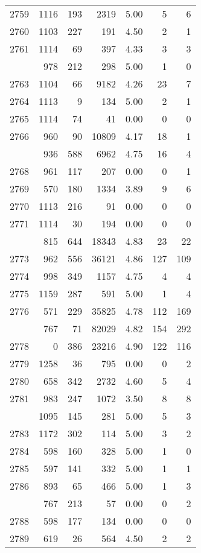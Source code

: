\documentclass[
]{article}
\begin{document}
\begin{table}
\begin{tabular}[t]{lrrrrrr}
2759 & 1116 & 193 & 2319 & 5.00 & 5 & 6\\
2760 & 1103 & 227 & 191 & 4.50 & 2 & 1\\
2761 & 1114 & 69 & 397 & 4.33 & 3 & 3\\
\addlinespace
2762 & 978 & 212 & 298 & 5.00 & 1 & 0\\
2763 & 1104 & 66 & 9182 & 4.26 & 23 & 7\\
2764 & 1113 & 9 & 134 & 5.00 & 2 & 1\\
2765 & 1114 & 74 & 41 & 0.00 & 0 & 0\\
2766 & 960 & 90 & 10809 & 4.17 & 18 & 1\\
\addlinespace
2767 & 936 & 588 & 6962 & 4.75 & 16 & 4\\
2768 & 961 & 117 & 207 & 0.00 & 0 & 1\\
2769 & 570 & 180 & 1334 & 3.89 & 9 & 6\\
2770 & 1113 & 216 & 91 & 0.00 & 0 & 0\\
2771 & 1114 & 30 & 194 & 0.00 & 0 & 0\\
\addlinespace
2772 & 815 & 644 & 18343 & 4.83 & 23 & 22\\
2773 & 962 & 556 & 36121 & 4.86 & 127 & 109\\
2774 & 998 & 349 & 1157 & 4.75 & 4 & 4\\
2775 & 1159 & 287 & 591 & 5.00 & 1 & 4\\
2776 & 571 & 229 & 35825 & 4.78 & 112 & 169\\
\addlinespace
2777 & 767 & 71 & 82029 & 4.82 & 154 & 292\\
2778 & 0 & 386 & 23216 & 4.90 & 122 & 116\\
2779 & 1258 & 36 & 795 & 0.00 & 0 & 2\\
2780 & 658 & 342 & 2732 & 4.60 & 5 & 4\\
2781 & 983 & 247 & 1072 & 3.50 & 8 & 8\\
\addlinespace
2782 & 1095 & 145 & 281 & 5.00 & 5 & 3\\
2783 & 1172 & 302 & 114 & 5.00 & 3 & 2\\
2784 & 598 & 160 & 328 & 5.00 & 1 & 0\\
2785 & 597 & 141 & 332 & 5.00 & 1 & 1\\
2786 & 893 & 65 & 466 & 5.00 & 1 & 3\\
\addlinespace
2787 & 767 & 213 & 57 & 0.00 & 0 & 2\\
2788 & 598 & 177 & 134 & 0.00 & 0 & 0\\
2789 & 619 & 26 & 564 & 4.50 & 2 & 2\\

\end{tabular}
\end{table}
\end{document}
